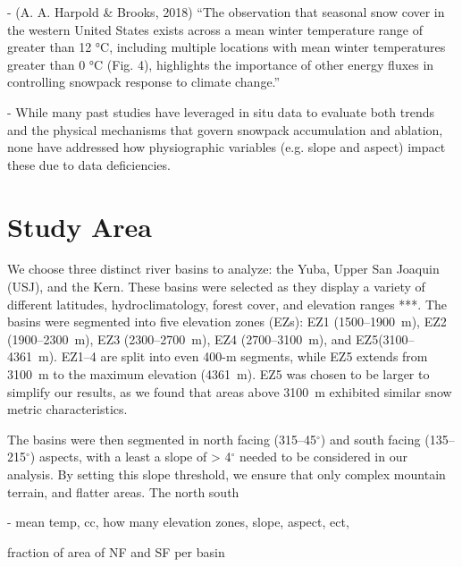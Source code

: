 -	(A. A. Harpold \& Brooks, 2018) “The observation that seasonal snow cover in the western United States exists across a mean winter temperature range of greater than 12 °C, including multiple locations with mean winter temperatures greater than 0 °C (Fig. 4), highlights the importance of other energy fluxes in controlling snowpack response to climate change.” \

-	While many past studies have leveraged in situ data to evaluate both trends and the physical mechanisms that govern snowpack accumulation and ablation, none have addressed how physiographic variables (e.g. slope and aspect) impact these due to data deficiencies. \

 

\hypertarget{ch2-sa}{\section{Study Area}\label{ch2-sa}}

We choose three distinct river basins to analyze: the Yuba, Upper San Joaquin (USJ), and the Kern. These basins were selected as they display a variety of different latitudes, hydroclimatology, forest cover, and elevation ranges ***. The basins were segmented into five elevation zones (EZs): EZ1 (1500--1900~m), EZ2 (1900--2300~m), EZ3 (2300--2700~m), EZ4 (2700--3100~m), and EZ5(3100--4361~m). EZ1--4 are split into even 400-m segments, while EZ5 extends from 3100~m to the maximum elevation (4361~m). EZ5 was chosen to be larger to simplify our results, as we found that areas above 3100~m exhibited similar snow metric characteristics. 

The basins were then segmented in north facing (315--45$^{\circ}$) and south facing (135--215$^{\circ}$) aspects, with a least a slope of > 4$^{\circ}$ needed to be considered in our analysis. By setting this slope threshold, we ensure that only complex mountain terrain, and flatter areas. The north south 



- mean temp, cc, how many elevation zones, slope, aspect, ect,

fraction of area of NF and SF per basin

